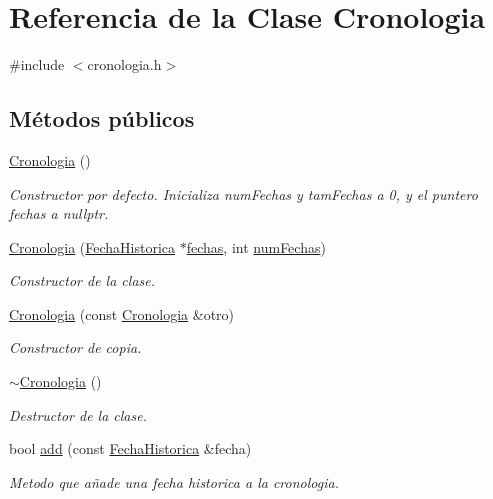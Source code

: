 \hypertarget{classCronologia}{}\section{Referencia de la Clase Cronologia}
\label{classCronologia}


{\ttfamily \#include $<$cronologia.\+h$>$}

\subsection*{Métodos públicos}
\begin{DoxyCompactItemize}
\item 
\hyperlink{classCronologia_ac0026b1919148f6cd6cf4ca4c357771e}{Cronologia} ()
\begin{DoxyCompactList}\small\item\em Constructor por defecto. Inicializa num\+Fechas y tam\+Fechas a 0, y el puntero fechas a nullptr. \end{DoxyCompactList}\item 
\hyperlink{classCronologia_ad2ef0894a05480239fd96e272afb862a}{Cronologia} (\hyperlink{classFechaHistorica}{Fecha\+Historica} $\ast$\hyperlink{classCronologia_a07e368866bedb6287af5787923ec31c7}{fechas}, int \hyperlink{classCronologia_a26810731cb188a3a026586a248225496}{num\+Fechas})
\begin{DoxyCompactList}\small\item\em Constructor de la clase. \end{DoxyCompactList}\item 
\hyperlink{classCronologia_a1a0efdfa1cd0451776dda65f3862105b}{Cronologia} (const \hyperlink{classCronologia}{Cronologia} \&otro)
\begin{DoxyCompactList}\small\item\em Constructor de copia. \end{DoxyCompactList}\item 
\hyperlink{classCronologia_a7e995892e46a00b54d70a905e2bdbc53}{$\sim$\+Cronologia} ()
\begin{DoxyCompactList}\small\item\em Destructor de la clase. \end{DoxyCompactList}\item 
bool \hyperlink{classCronologia_a4e80e480d5f6c772cca29338468a443c}{add} (const \hyperlink{classFechaHistorica}{Fecha\+Historica} \&fecha)
\begin{DoxyCompactList}\small\item\em Metodo que añade una fecha historica a la cronologia. \end{DoxyCompactList}\item 

\end{DoxyCompactItemize}
